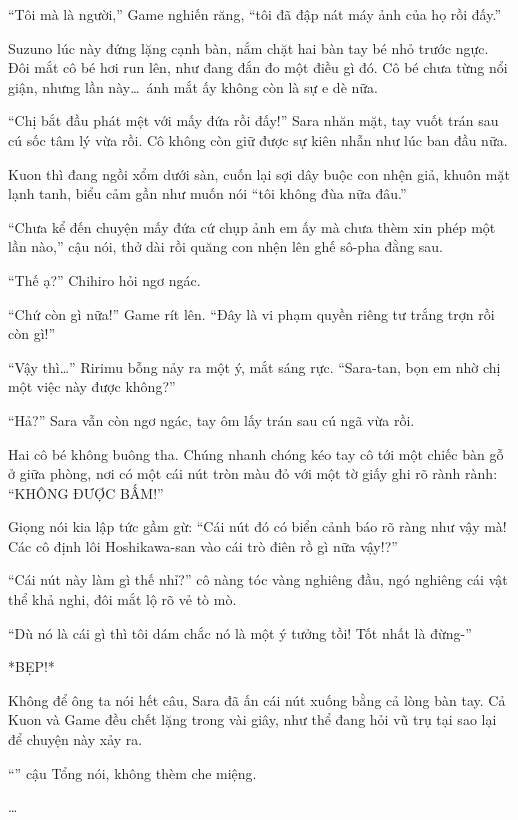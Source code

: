 \documentclass[../main.tex]{subfiles}
\begin{document}
``Tôi mà là người,'' Game nghiến răng, ``tôi đã đập nát máy ảnh của họ rồi đấy.''

Suzuno lúc này đứng lặng cạnh bàn, nắm chặt hai bàn tay bé nhỏ trước ngực. Đôi mắt cô bé hơi run lên, như đang đắn đo một điều gì đó. Cô bé chưa từng nổi giận, nhưng lần này\dots\ ánh mắt ấy không còn là sự e dè nữa.

``Chị bắt đầu phát mệt với mấy đứa rồi đấy!''  Sara nhăn mặt, tay vuốt trán sau cú sốc tâm lý vừa rồi. Cô không còn giữ được sự kiên nhẫn như lúc ban đầu nữa.

Kuon thì đang ngồi xổm dưới sàn, cuốn lại sợi dây buộc con nhện giả, khuôn mặt lạnh tanh, biểu cảm gần như muốn nói ``tôi không đùa nữa đâu.''

``Chưa kể đến chuyện mấy đứa cứ chụp ảnh em ấy mà chưa thèm xin phép một lần nào,'' cậu nói, thở dài rồi quăng con nhện lên ghế sô-pha đằng sau.

``Thế ạ?'' Chihiro hỏi ngơ ngác.

``Chứ còn gì nữa!'' Game rít lên. ``Đây là vi phạm quyền riêng tư trắng trợn rồi còn gì!''

``Vậy thì\dots'' Ririmu bỗng nảy ra một ý, mắt sáng rực. ``Sara-tan, bọn em nhờ chị một việc này được không?''

``Hả?'' Sara vẫn còn ngơ ngác, tay ôm lấy trán sau cú ngã vừa rồi.

Hai cô bé không buông tha. Chúng nhanh chóng kéo tay cô tới một chiếc bàn gỗ ở giữa phòng, nơi có một cái nút tròn màu đỏ với một tờ giấy ghi rõ rành rành: ``KHÔNG ĐƯỢC BẤM!''

Giọng nói kia lập tức gầm gừ: ``Cái nút đó có biển cảnh báo rõ ràng như vậy mà! Các cô định lôi Hoshikawa-san vào cái trò điên rồ gì nữa vậy!?''

``Cái nút này làm gì thế nhỉ?'' cô nàng tóc vàng nghiêng đầu, ngó nghiêng cái vật thể khả nghi, đôi mắt lộ rõ vẻ tò mò.

``Dù nó là cái gì thì tôi dám chắc nó là một ý tưởng tồi! Tốt nhất là đừng-''

*BẸP!*

Không để ông ta nói hết câu, Sara đã ấn cái nút xuống bằng cả lòng bàn tay. Cả Kuon và Game đều chết lặng trong vài giây, như thể đang hỏi vũ trụ tại sao lại để chuyện này xảy ra.


``'' cậu Tổng nói, không thèm che miệng.

\dots
\end{document}
